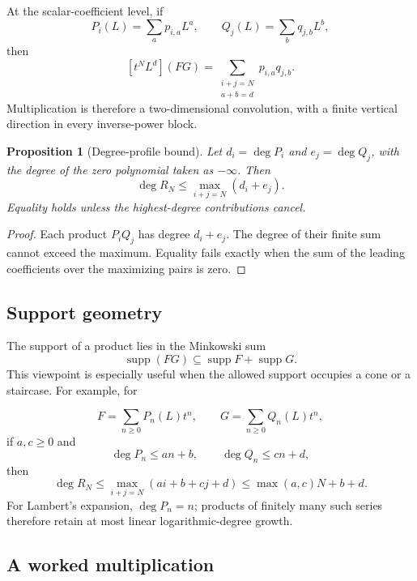 \documentclass[11pt]{article}
\theoremstyle{pltheorem}
\newtheorem{proposition}[theorem]{Proposition}
\newcommand{\supp}{\operatorname{supp}}
\begin{document}
At the scalar-coefficient level, if
\[
 P_i(L)=\sum_a p_{i,a}L^a,
 \qquad
 Q_j(L)=\sum_b q_{j,b}L^b,
\]
then
\begin{equation}\label{eq:2d-convolution}
 [t^NL^d](FG)
 =\sum_{\substack{i+j=N\\a+b=d}}p_{i,a}q_{j,b}.
\end{equation}
Multiplication is therefore a two-dimensional convolution, with a finite vertical direction in every inverse-power block.

\begin{proposition}[Degree-profile bound]\label{prop:degree-profile}
Let \(d_i=\deg P_i\) and \(e_j=\deg Q_j\), with the degree of the zero polynomial taken as \(-\infty\).  Then
\begin{equation}\label{eq:degree-bound}
 \deg R_N\le\max_{i+j=N}(d_i+e_j).
\end{equation}
Equality holds unless the highest-degree contributions cancel.
\end{proposition}

\begin{proof}
Each product \(P_iQ_j\) has degree \(d_i+e_j\).  The degree of their finite sum cannot exceed the maximum.  Equality fails exactly when the sum of the leading coefficients over the maximizing pairs is zero.
\end{proof}

\subsection{Support geometry}

The support of a product lies in the Minkowski sum
\begin{equation}\label{eq:support-Minkowski}
 \supp(FG)\subseteq \supp F+\supp G.
\end{equation}
This viewpoint is especially useful when the allowed support occupies a cone or a staircase.  For example, for

\[
 F=\sum_{n\ge0}P_n(L)t^n,
 \qquad
 G=\sum_{n\ge0}Q_n(L)t^n,
\]
if \(a,c\ge0\) and
\[
 \deg P_n\le an+b,
 \qquad
 \deg Q_n\le cn+d,
\]
then
\begin{equation}\label{eq:linear-degree-profile}
 \deg R_N\le \max_{i+j=N}(ai+b+cj+d)
 \le \max(a,c)N+b+d.
\end{equation}
For Lambert's expansion, \(\deg P_n=n\); products of finitely many such series therefore retain at most linear logarithmic-degree growth.

\subsection{A worked multiplication}
\end{document}
